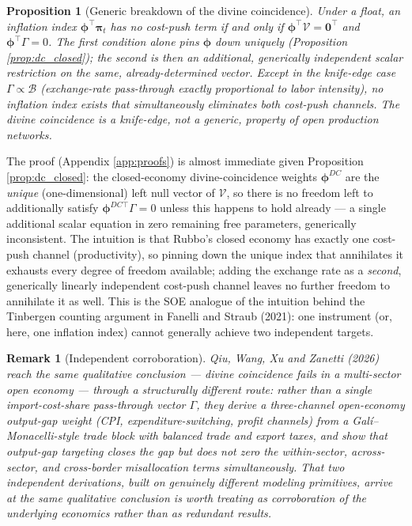 \documentclass[12pt]{article}
\newtheorem{proposition}{Proposition}
\newtheorem{remark}{Remark}
\begin{document}
\begin{proposition}[Generic breakdown of the divine coincidence]
\label{prop:dc_breakdown}
Under a float, an inflation index $\bm\phi^\top\bm\pi_t$ has no cost-push term if and only if
$\bm\phi^\top\mathcal V=\mathbf 0^\top$ \emph{and} $\bm\phi^\top\Gamma=0$. The first condition alone
pins $\bm\phi$ down uniquely (Proposition \ref{prop:dc_closed}); the second is then an
\emph{additional}, generically independent scalar restriction on the same, already-determined vector.
Except in the knife-edge case $\Gamma\propto\mathcal B$ (exchange-rate pass-through exactly
proportional to labor intensity), no inflation index exists that simultaneously eliminates both
cost-push channels. The divine coincidence is a knife-edge, not a generic, property of open production
networks.
\end{proposition}

The proof (Appendix \ref{app:proofs}) is almost immediate given Proposition \ref{prop:dc_closed}: the
closed-economy divine-coincidence weights $\bm\phi^{DC}$ are the \emph{unique} (one-dimensional) left
null vector of $\mathcal V$, so there is no freedom left to additionally satisfy
$\bm\phi^{DC\top}\Gamma=0$ unless this happens to hold already --- a single additional scalar equation
in zero remaining free parameters, generically inconsistent. The intuition is that Rubbo's closed
economy has exactly one cost-push channel (productivity), so pinning down the unique index that
annihilates it exhausts every degree of freedom available; adding the exchange rate as a
\emph{second}, generically linearly independent cost-push channel leaves no further freedom to
annihilate it as well. This is the SOE analogue of the intuition behind the Tinbergen counting
argument in Fanelli and Straub (2021): one instrument (or, here, one inflation index) cannot generally
achieve two independent targets.

\begin{remark}[Independent corroboration]
Qiu, Wang, Xu and Zanetti (2026) reach the same qualitative conclusion --- divine coincidence fails in
a multi-sector open economy --- through a structurally different route: rather than a single
import-cost-share pass-through vector $\Gamma$, they derive a three-channel open-economy output-gap
weight (CPI, expenditure-switching, profit channels) from a Gal\'i--Monacelli-style trade block with
balanced trade and export taxes, and show that output-gap targeting closes the gap but does not zero
the within-sector, across-sector, and cross-border misallocation terms simultaneously. That two
independent derivations, built on genuinely different modeling primitives, arrive at the same
qualitative conclusion is worth treating as corroboration of the underlying economics rather than as
redundant results.
\end{remark}
\end{document}

